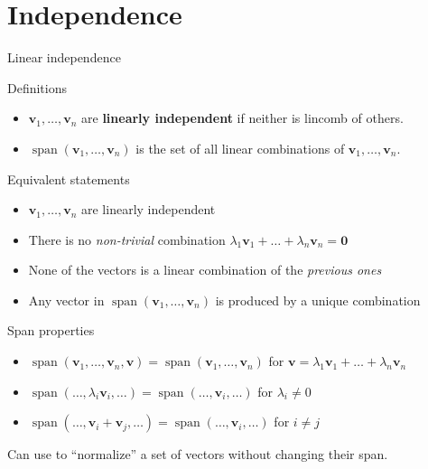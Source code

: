 \documentclass[10pt]{beamer}
\begin{document}
\section{Independence}
\begin{frame}{Linear independence}
    \begin{block}{Definitions}
        \begin{itemize}
            \item $\mathbf v_1, \dots,\mathbf v_n$ are \textbf{linearly independent} if neither is lincomb of others.
            \item $\operatorname{span}(\mathbf v_1, \dots, \mathbf v_n)$ is the set of all linear combinations of $\mathbf v_1, \dots, \mathbf v_n$.
        \end{itemize}
    \end{block}

    \begin{block}{Equivalent statements}
        \begin{itemize}
            \item $\mathbf v_1, \dots, \mathbf v_n$ are linearly independent
            \item There is no \textit{non-trivial} combination $\lambda_1 \mathbf v_1 + \dots + \lambda_n \mathbf v_n = \mathbf 0$
            \item None of the vectors is a linear combination of the \textit{previous ones}
            \item Any vector in $\operatorname{span}(\mathbf v_1, \dots,\mathbf v_n)$ is produced by a unique combination
        \end{itemize}
    \end{block}
\end{frame}

\begin{frame}{Span properties}
    \begin{itemize}
        \item $\operatorname{span}(\mathbf v_1, \dots, \mathbf v_n, \mathbf v) = \operatorname{span}(\mathbf v_1, \dots, \mathbf v_n)$ for $\mathbf v =\lambda_1 \mathbf v_1 + \dots + \lambda_n \mathbf v_n$
        \item $\operatorname{span}(\dots, \lambda_i \mathbf v_i, \dots) = \operatorname{span}(\dots, \mathbf v_i, \dots)$ for $\lambda_i \neq 0$
        \item $\operatorname{span}(\dots, \mathbf v_i + \mathbf v_j, \dots) = \operatorname{span}(\dots, \mathbf v_i,\dots)$ for $i \neq j$
    \end{itemize}
    Can use to ``normalize'' a set of vectors without changing their span.
\end{frame}
\end{document}

